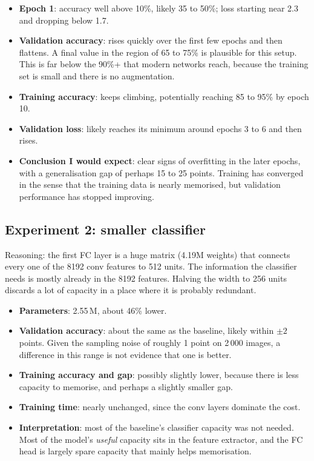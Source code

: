 \documentclass[11pt]{article}
\newcommand{\key}[1]{\textbf{#1}}
\begin{document}
\begin{itemize}[noitemsep]
\item \key{Epoch 1}: accuracy well above 10\%, likely 35 to 50\%; loss starting near 2.3 and dropping below 1.7.
\item \key{Validation accuracy}: rises quickly over the first few epochs and then flattens. A final value in the region of 65 to 75\% is plausible for this setup. This is far below the 90\%+ that modern networks reach, because the training set is small and there is no augmentation.
\item \key{Training accuracy}: keeps climbing, potentially reaching 85 to 95\% by epoch 10.
\item \key{Validation loss}: likely reaches its minimum around epochs 3 to 6 and then rises.
\item \key{Conclusion I would expect}: clear signs of overfitting in the later epochs, with a generalisation gap of perhaps 15 to 25 points. Training has converged in the sense that the training data is nearly memorised, but validation performance has stopped improving.
\end{itemize}

\subsection{Experiment 2: smaller classifier}

Reasoning: the first FC layer is a huge matrix (4.19M weights) that connects every one of the 8192 conv features to 512 units. The information the classifier needs is mostly already in the 8192 features. Halving the width to 256 units discards a lot of capacity in a place where it is probably redundant.

\begin{itemize}[noitemsep]
\item \key{Parameters}: 2.55\,M, about 46\% lower.
\item \key{Validation accuracy}: about the same as the baseline, likely within $\pm 2$ points. Given the sampling noise of roughly 1 point on 2\,000 images, a difference in this range is not evidence that one is better.
\item \key{Training accuracy and gap}: possibly slightly lower, because there is less capacity to memorise, and perhaps a slightly smaller gap.
\item \key{Training time}: nearly unchanged, since the conv layers dominate the cost.
\item \key{Interpretation}: most of the baseline's classifier capacity was not needed. Most of the model's \emph{useful} capacity sits in the feature extractor, and the FC head is largely spare capacity that mainly helps memorisation.
\end{itemize}
\end{document}
